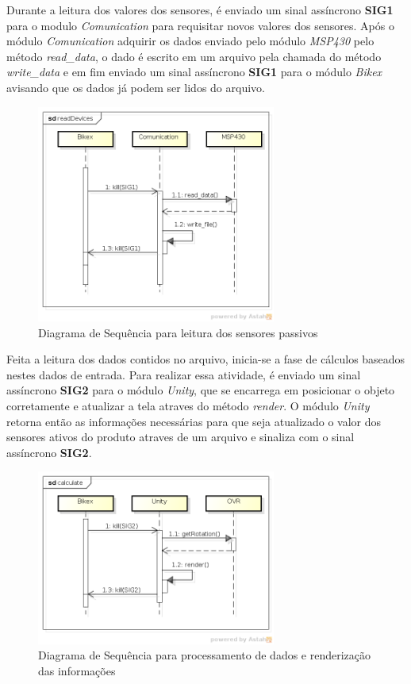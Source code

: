 Durante a leitura dos valores dos sensores, é enviado um sinal assíncrono \textbf{SIG1} para o modulo \textit{Comunication}  para requisitar novos valores dos sensores. Após o módulo \textit{Comunication} adquirir os dados enviado pelo módulo \textit{MSP430} pelo método \textit{read\_data}, o dado é escrito em um arquivo pela chamada do método \textit{write\_data} e em fim enviado um sinal assíncrono \textbf{SIG1} para o módulo \textit{Bikex} avisando que os dados já podem ser lidos do arquivo.

\begin{figure}[h]
  \centering
	\includegraphics[width=0.7\textwidth]{figuras/readDevices}
  \caption{Diagrama de Sequência para leitura dos sensores passivos}
  \label{fig:diagrama-sequencia-read-devices}
\end{figure}

Feita a leitura dos dados contidos no arquivo, inicia-se a fase de cálculos baseados nestes dados de entrada. Para realizar essa atividade, é enviado um sinal assíncrono \textbf{SIG2} para o módulo \textit{Unity}, que se encarrega em posicionar o objeto corretamente e atualizar a tela atraves do método \textit{render}. O módulo \textit{Unity} retorna então as informações necessárias para que seja atualizado o valor dos sensores ativos do produto atraves de um arquivo  e sinaliza com o sinal assíncrono \textbf{SIG2}.

\begin{figure}[h]
  \centering
	\includegraphics[width=0.7\textwidth]{figuras/calculate}
  \caption{Diagrama de Sequência para processamento de dados e renderização das informações}
  \label{fig:diagrama-sequencia-calculate}
\end{figure}

